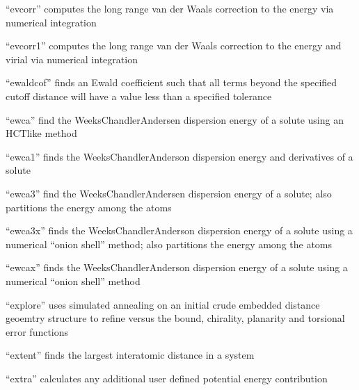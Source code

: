 \documentclass[letterpaper,11pt,english]{sphinxmanual}
\begin{document}
“evcorr” computes the long range van der Waals correction
to the energy via numerical integration


“evcorr1” computes the long range van der Waals correction
to the energy and virial via numerical integration


“ewaldcof” finds an Ewald coefficient such that all terms
beyond the specified cutoff distance will have a value less
than a specified tolerance


“ewca” find the Weeks\sphinxhyphen{}Chandler\sphinxhyphen{}Andersen dispersion energy
of a solute using an HCT\sphinxhyphen{}like method


“ewca1” finds the Weeks\sphinxhyphen{}Chandler\sphinxhyphen{}Anderson dispersion energy
and derivatives of a solute


“ewca3” find the Weeks\sphinxhyphen{}Chandler\sphinxhyphen{}Andersen dispersion energy
of a solute; also partitions the energy among the atoms


“ewca3x” finds the Weeks\sphinxhyphen{}Chandler\sphinxhyphen{}Anderson dispersion energy
of a solute using a numerical “onion shell” method; also
partitions the energy among the atoms


“ewcax” finds the Weeks\sphinxhyphen{}Chandler\sphinxhyphen{}Anderson dispersion energy
of a solute using a numerical “onion shell” method


“explore” uses simulated annealing on an initial crude
embedded distance geoemtry structure to refine versus the
bound, chirality, planarity and torsional error functions


“extent” finds the largest interatomic distance in a system


“extra” calculates any additional user defined potential
energy contribution
\end{document}
